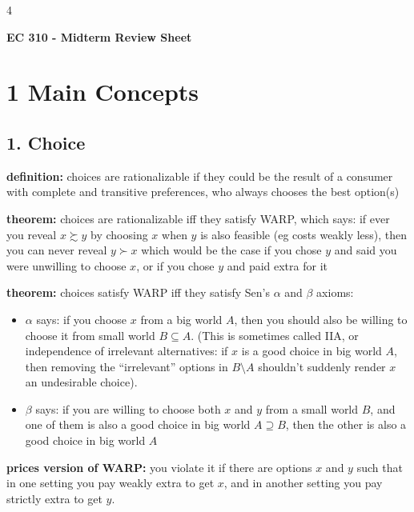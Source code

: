 \documentclass[8pt,landscape]{extarticle}
\begin{document}
\begin{multicols}{4}
\setlength{\premulticols}{1pt}
\setlength{\postmulticols}{1pt}
\setlength{\multicolsep}{1pt}
\setlength{\columnsep}{15pt}

\begin{center}
\textbf{\Large EC 310 - Midterm Review Sheet}
\end{center}

\section*{1 Main Concepts}

\subsection*{1. Choice}
\textbf{definition:} choices are rationalizable if they could be the result of a consumer with complete and transitive preferences, who always chooses the best option(s)

\textbf{theorem:} choices are rationalizable iff they satisfy WARP, which says: if ever you reveal $x \succsim y$ by choosing $x$ when $y$ is also feasible (eg costs weakly less), then you can never reveal $y \succ x$ which would be the case if you chose $y$ and said you were unwilling to choose $x$, or if you chose $y$ and paid extra for it

\textbf{theorem:} choices satisfy WARP iff they satisfy Sen's $\alpha$ and $\beta$ axioms:
\begin{itemize}[leftmargin=*,noitemsep,topsep=0pt]
\item $\alpha$ says: if you choose $x$ from a big world $A$, then you should also be willing to choose it from small world $B \subseteq A$. (This is sometimes called IIA, or independence of irrelevant alternatives: if $x$ is a good choice in big world $A$, then removing the ``irrelevant'' options in $B \setminus A$ shouldn't suddenly render $x$ an undesirable choice).
\item $\beta$ says: if you are willing to choose both $x$ and $y$ from a small world $B$, and one of them is also a good choice in big world $A \supseteq B$, then the other is also a good choice in big world $A$
\end{itemize}

\textbf{prices version of WARP:} you violate it if there are options $x$ and $y$ such that in one setting you pay weakly extra to get $x$, and in another setting you pay strictly extra to get $y$.


\end{multicols}
\end{document}
